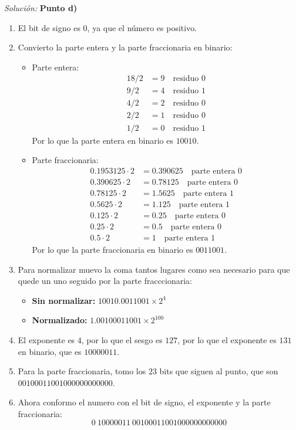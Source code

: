 \documentclass{article}
\newenvironment{solution}
    {\textit{Solución:}}
    {}
\begin{document}
\begin{solution}
\textbf{Punto d)}
\begin{enumerate}
    \item El bit de signo es $0$, ya que el número es positivo.
    \item Convierto la parte entera y la parte fraccionaria en binario:
    \begin{itemize}
        \item Parte entera:
        \begin{align*}
            18/2 &= 9 \quad \text{residuo } 0\\
            9/2 &= 4 \quad \text{residuo } 1\\
            4/2 &= 2 \quad \text{residuo } 0\\
            2/2 &= 1 \quad \text{residuo } 0\\
            1/2 &= 0 \quad \text{residuo } 1
        \end{align*}
        Por lo que la parte entera en binario es $10010$.
        \item Parte fraccionaria:
        \begin{align*}
            0.1953125 \cdot 2 &= 0.390625 \quad \text{parte entera } 0\\
            0.390625 \cdot 2 &= 0.78125 \quad \text{parte entera } 0\\
            0.78125 \cdot 2 &= 1.5625 \quad \text{parte entera } 1\\
            0.5625 \cdot 2 &= 1.125 \quad \text{parte entera } 1\\
            0.125 \cdot 2 &= 0.25 \quad \text{parte entera } 0\\
            0.25 \cdot 2 &= 0.5 \quad \text{parte entera } 0\\
            0.5 \cdot 2 &= 1 \quad \text{parte entera } 1
        \end{align*}
        Por lo que la parte fraccionaria en binario es $0011001$.
    \end{itemize}
    \item Para normalizar muevo la coma tantos lugares como sea necesario para que quede un uno seguido por la parte fracccionaria:
        \begin{itemize}
            \item \textbf{Sin normalizar:} $10010.0011001 \times 2^4$
            \item \textbf{Normalizado:} $1.00100011001 \times 2^{100}$
        \end{itemize}
    \item El exponente es $4$, por lo que el sesgo es $127$, por lo que el exponente es $131$ en binario, que es $10000011$.
    \item Para la parte fraccionaria, tomo los $23$ bits que siguen al punto, que son $00100011001000000000000$.
    \item Ahora conformo el numero con el bit de signo, el exponente y la parte fraccionaria:
    \begin{equation*}
        0 \ 10000011 \ 00100011001000000000000
    \end{equation*}
\end{enumerate}


\end{solution}
\end{document}
